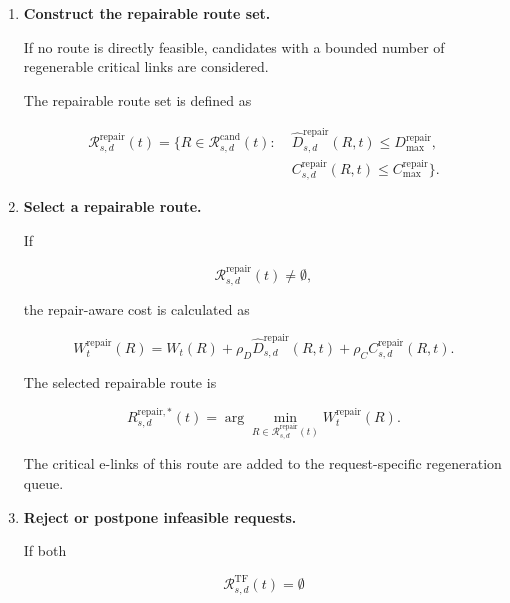 \begin{enumerate}
The required e-bits are reserved and the planned swapping operations are executed.


\item \textbf{Construct the repairable route set.}

If no route is directly feasible, candidates with a bounded number of regenerable critical links are considered.

The repairable route set is defined as

\begin{equation}
\begin{aligned}
\mathcal{R}_{s,d}^{\mathrm{repair}}(t)
=
\bigl\{
R \in \mathcal{R}_{s,d}^{\mathrm{cand}}(t)
:\;&
\widehat{D}_{s,d}^{\mathrm{repair}}(R,t)
\leq D_{\max}^{\mathrm{repair}},
\\
&
C_{s,d}^{\mathrm{repair}}(R,t)
\leq C_{\max}^{\mathrm{repair}}
\bigr\}.
\end{aligned}
\end{equation}


\item \textbf{Select a repairable route.}

If

\begin{equation}
    \mathcal{R}_{s,d}^{\mathrm{repair}}(t)
    \neq
    \emptyset,
\end{equation}

the repair-aware cost is calculated as

\begin{equation}
    W_t^{\mathrm{repair}}(R)
    =
    W_t(R)
    +
    \rho_D
    \widehat{D}_{s,d}^{\mathrm{repair}}(R,t)
    +
    \rho_C
    C_{s,d}^{\mathrm{repair}}(R,t).
\end{equation}

The selected repairable route is

\begin{equation}
    R_{s,d}^{\mathrm{repair},*}(t)
    =
    \arg\min_{
    R
    \in
    \mathcal{R}_{s,d}^{\mathrm{repair}}(t)
    }
    W_t^{\mathrm{repair}}(R).
\end{equation}

The critical e-links of this route are added to the request-specific regeneration queue.


\item \textbf{Reject or postpone infeasible requests.}

If both

\begin{equation}
    \mathcal{R}_{s,d}^{\mathrm{TF}}(t)
    =
    \emptyset
\end{equation}


\end{enumerate}
